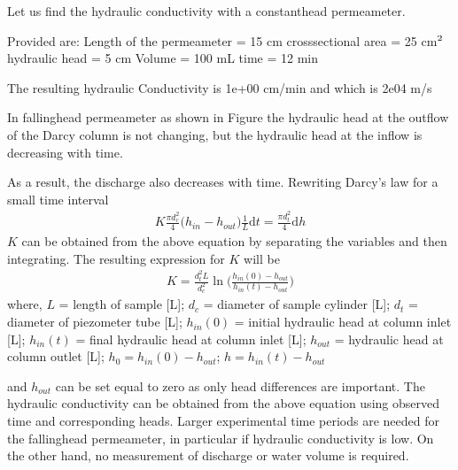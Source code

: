 \documentclass[letterpaper,10pt,english]{sphinxmanual}
\let\sphinxpxdimen\pdfpxdimen\else\newdimen\sphinxpxdimen
\begin{document}
\begin{sphinxVerbatim}[commandchars=\\\{\}]
Let us find the hydraulic conductivity with a constant\PYGZhy{}head permeameter.

Provided are:
Length of the permeameter = 15 cm 
cross\PYGZhy{}sectional area = 25 cm\(\sp{\text{2}}\)
hydraulic head = 5 cm 
Volume = 100 mL 
time = 12 min 

The resulting hydraulic Conductivity is 1e+00 cm/min 
and which is 2e\PYGZhy{}04 m/s
\end{sphinxVerbatim}

In falling\sphinxhyphen{}head permeameter as shown in Figure the hydraulic head at the outflow of
the Darcy column is not changing, but the hydraulic head at the inflow is decreasing
with time.

\noindent\sphinxincludegraphics[width=250\sphinxpxdimen]{{L4_f6}.png}

As a result, the discharge also decreases with time. Rewriting Darcy’s law for a small time interval
\begin{equation*}
\begin{split}
K \frac{\pi d_c^2}{4}\big(h_{in} - h_{out}\big)\frac{1}{L}\text{d}t = \frac{\pi d_t^2}{4}\text{d}h 
\end{split}
\end{equation*}
\(K\) can be obtained from the above equation by separating the variables and then integrating. The resulting expression for \(K\) will be
\begin{equation*}
\begin{split}
K = \frac{d_t^2 L}{d_c^2}\ln \Bigg(\frac{h_{in}(0) - h_{out}}{h_{in}(t)-h_{out}}\Bigg)
\end{split}
\end{equation*}
where, 
\(L\) = length of sample {[}L{]};
\(d_c\) = diameter of sample cylinder {[}L{]};
\(d_t\) = diameter of piezometer tube {[}L{]}; 
\(h_{in}(0)\) = initial hydraulic head at column inlet {[}L{]}; 
\(h_{in}(t)\) = final hydraulic head at column inlet {[}L{]}; 
\(h_{out}\) = hydraulic head at column outlet {[}L{]}; 
\(h_0 = h_{in}(0) - h_{out}\); 
\(h = h_{in}(t) - h_{out}\)

and \(h_{out}\) can be set equal to zero as only head differences are
important. The hydraulic conductivity can be obtained from the above equation using observed time and corresponding heads. Larger experimental time periods are needed for the falling\sphinxhyphen{}head permeameter, in particular if hydraulic conductivity is low. On the other hand, no measurement of discharge or water volume is required.
\end{document}
